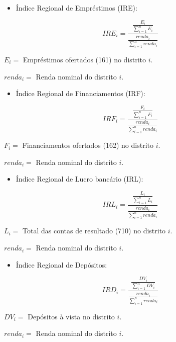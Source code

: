 \documentclass[a4paper,12pt]{article}
\providecommand{\tightlist}{%
  \setlength{\itemsep}{0pt}\setlength{\parskip}{0pt}}\usepackage{longtable,booktabs,array}
\begin{document}
\begin{itemize}
\tightlist
\item
  Índice Regional de Empréstimos (IRE):
\end{itemize}

\begin{equation}
IRE_{i} = \frac{\frac{E_i}{\sum_{i=1}^n E_i}}{\frac{renda_i}{\sum_{i=1}^n renda_i}}
\end{equation}

\(E_i =\) Empréstimos ofertados (161) no distrito \(i\).

\(renda_i =\) Renda nominal do distrito \(i\).

\begin{itemize}
\tightlist
\item
  Índice Regional de Financiamentos (IRF):
\end{itemize}

\begin{equation}
IRF_{i} = \frac{\frac{F_i}{\sum_{i=1}^n F_i}}{\frac{renda_i}{\sum_{i=1}^n renda_i}}
\end{equation}

\(F_i =\) Financiamentos ofertados (162) no distrito \(i\).

\(renda_i =\) Renda nominal do distrito \(i\).

\begin{itemize}
\tightlist
\item
  Índice Regional de Lucro bancário (IRL):
\end{itemize}

\begin{equation}
IRL_{i} = \frac{\frac{L_i}{\sum_{i=1}^n L_i}}{\frac{renda_i}{\sum_{i=1}^n renda_i}}
\end{equation}

\(L_i =\) Total das contas de resultado (710) no distrito \(i\).

\(renda_i =\) Renda nominal do distrito \(i\).

\begin{itemize}
\tightlist
\item
  Índice Regional de Depósitos:
\end{itemize}

\begin{equation}
IRD_{i} = \frac{\frac{DV_i}{\sum_{i=1}^n DV_i}}{\frac{renda_i}{\sum_{i=1}^n renda_i}}
\end{equation}

\(DV_i =\) Depósitos à vista no distrito \(i\).

\(renda_i =\) Renda nominal do distrito \(i\).
\end{document}
